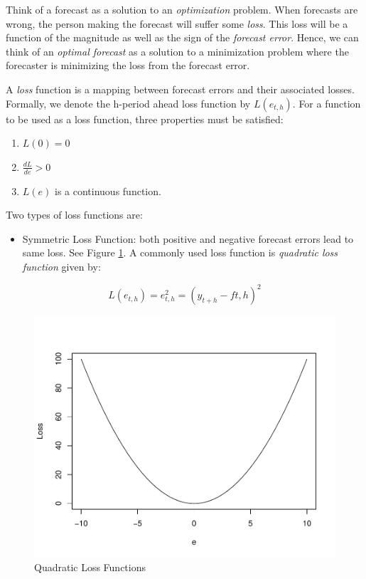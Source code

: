 \documentclass[]{book}
\providecommand{\tightlist}{%
  \setlength{\itemsep}{0pt}\setlength{\parskip}{0pt}}
\theoremstyle{definition}
\theoremstyle{definition}
\theoremstyle{definition}
\theoremstyle{remark}
\let\BeginKnitrBlock\begin \let\EndKnitrBlock\end
\begin{document}
Think of a forecast as a solution to an \emph{optimization} problem. When forecasts are wrong, the person making the forecast will suffer some \emph{loss}. This loss will be a function of the magnitude as well as the sign of the \emph{forecast error}. Hence, we can think of an \emph{optimal forecast} as a solution to a minimization problem where the forecaster is minimizing the loss from the forecast error.

\BeginKnitrBlock{definition}[Loss Function]
\protect\hypertarget{def:d5}{}{\label{def:d5} {} }
\EndKnitrBlock{definition}

A \emph{loss} function is a mapping between forecast errors and their associated losses. Formally, we denote the h-period ahead loss function by \(L(e_{t,h})\). For a function to be used as a loss function, three properties must be satisfied:

\begin{enumerate}
\def\labelenumi{\arabic{enumi}.}
\tightlist
\item
  \(L(0)=0\)
\item
  \(\frac{dL}{de}>0\)
\item
  \(L(e)\) is a continuous function.
\end{enumerate}

Two types of loss functions are:

\begin{itemize}
\tightlist
\item
  Symmetric Loss Function: both positive and negative forecast errors lead to same loss. See Figure \ref{fig:ch1-figure5}. A commonly used loss function is \emph{quadratic loss function} given by:
\end{itemize}

\begin{equation}
L(e_{t,h})=e_{t,h}^2 = (y_{t+h}-f{t,h})^2
\end{equation}

\begin{figure}

{\centering \includegraphics[width=0.8\linewidth]{bookdown-demo_files/figure-latex/ch1-figure5-1} 

}

\caption{Quadratic Loss Functions}\label{fig:ch1-figure5}
\end{figure}
\end{document}
